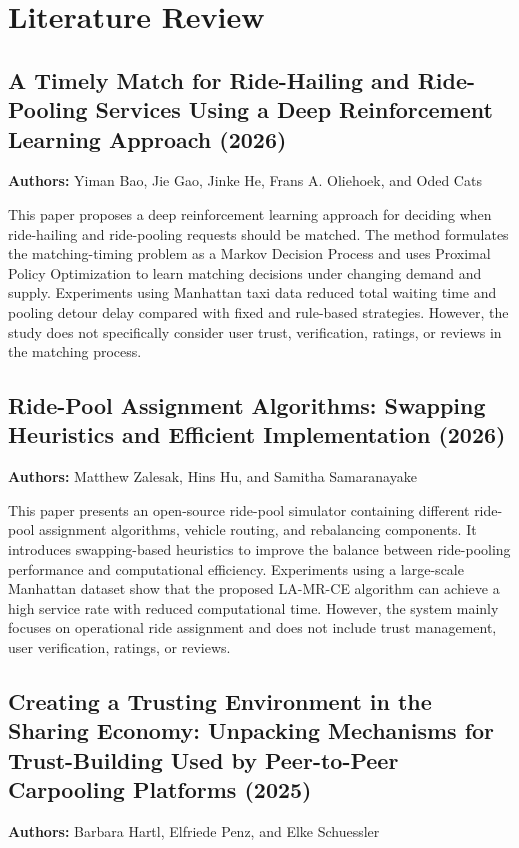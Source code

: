 \documentclass[12pt,a4paper,oneside]{report}
\begin{document}
\section{Literature Review}

\subsection{A Timely Match for Ride-Hailing and Ride-Pooling Services Using a Deep Reinforcement Learning Approach (2026)}
\textbf{Authors:} Yiman Bao, Jie Gao, Jinke He, Frans A. Oliehoek, and Oded Cats

This paper proposes a deep reinforcement learning approach for deciding when
ride-hailing and ride-pooling requests should be matched. The method formulates
the matching-timing problem as a Markov Decision Process and uses Proximal
Policy Optimization to learn matching decisions under changing demand and
supply. Experiments using Manhattan taxi data reduced total waiting time and
pooling detour delay compared with fixed and rule-based strategies. However,
the study does not specifically consider user trust, verification, ratings, or
reviews in the matching process.

\subsection{Ride-Pool Assignment Algorithms: Swapping Heuristics and Efficient Implementation (2026)}
\textbf{Authors:} Matthew Zalesak, Hins Hu, and Samitha Samaranayake

This paper presents an open-source ride-pool simulator containing different
ride-pool assignment algorithms, vehicle routing, and rebalancing components.
It introduces swapping-based heuristics to improve the balance between
ride-pooling performance and computational efficiency. Experiments using a
large-scale Manhattan dataset show that the proposed LA-MR-CE algorithm can
achieve a high service rate with reduced computational time. However, the
system mainly focuses on operational ride assignment and does not include trust
management, user verification, ratings, or reviews.

\subsection{Creating a Trusting Environment in the Sharing Economy: Unpacking Mechanisms for Trust-Building Used by Peer-to-Peer Carpooling Platforms (2025)}
\textbf{Authors:} Barbara Hartl, Elfriede Penz, and Elke Schuessler
\end{document}
